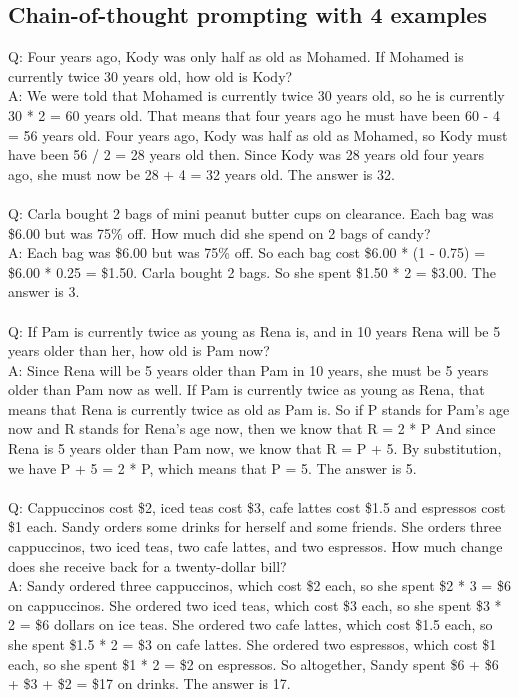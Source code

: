 \noindent
\subsection{Chain-of-thought prompting with 4 examples}
Q: Four years ago, Kody was only half as old as Mohamed. If Mohamed is currently twice 30 years old, how old is Kody? \\
A: We were told that Mohamed is currently twice 30 years old, so he is currently 30 * 2 = 60 years old. That means that four years ago he must have been 60 - 4 = 56 years old. Four years ago, Kody was half as old as Mohamed, so Kody must have been 56 / 2 = 28 years old then. Since Kody was 28 years old four years ago, she must now be 28 + 4 = 32 years old. The answer is 32. \\
 \\
Q: Carla bought 2 bags of mini peanut butter cups on clearance. Each bag was \$6.00 but was 75\% off. How much did she spend on 2 bags of candy? \\
A: Each bag was \$6.00 but was 75\% off. So each bag cost \$6.00 * (1 - 0.75) = \$6.00 * 0.25 = \$1.50. Carla bought 2 bags. So she spent \$1.50 * 2 = \$3.00. The answer is 3. \\
 \\
Q: If Pam is currently twice as young as Rena is, and in 10 years Rena will be 5 years older than her, how old is Pam now? \\
A: Since Rena will be 5 years older than Pam in 10 years, she must be 5 years older than Pam now as well. If Pam is currently twice as young as Rena, that means that Rena is currently twice as old as Pam is. So if P stands for Pam's age now and R stands for Rena's age now, then we know that R = 2 * P And since Rena is 5 years older than Pam now, we know that R = P + 5. By substitution, we have P + 5 = 2 * P, which means that P = 5. The answer is 5. \\
 \\
Q: Cappuccinos cost \$2, iced teas cost \$3, cafe lattes cost \$1.5 and espressos cost \$1 each. Sandy orders some drinks for herself and some friends. She orders three cappuccinos, two iced teas, two cafe lattes, and two espressos. How much change does she receive back for a twenty-dollar bill? \\
A: Sandy ordered three cappuccinos, which cost \$2 each, so she spent \$2 * 3 = \$6 on cappuccinos. She ordered two iced teas, which cost \$3 each, so she spent \$3 * 2 = \$6 dollars on ice teas. She ordered two cafe lattes, which cost \$1.5 each, so she spent \$1.5 * 2 = \$3 on cafe lattes. She ordered two espressos, which cost \$1 each, so she spent \$1 * 2 = \$2 on espressos. So altogether, Sandy spent \$6 + \$6 + \$3 + \$2 = \$17 on drinks. The answer is 17. \\

